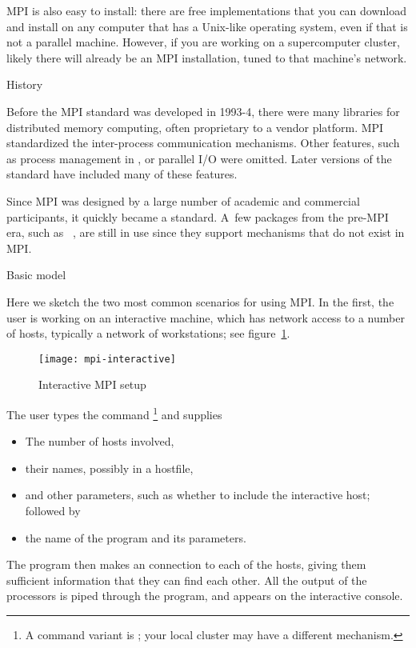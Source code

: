 MPI is also easy to install: there are free implementations
that you can download and install on any computer that has a Unix-like
operating system, even if that is not a parallel machine.
However, if you are working on a supercomputer cluster,
likely there will already be an MPI installation,
tuned to that machine's network.

 {History}

Before the MPI standard was developed in 1993-4, there were many
libraries for distributed memory computing, often proprietary
to a vendor platform. MPI standardized the inter-process communication
mechanisms. Other features, such as process management in ,
or parallel I/O were omitted. Later versions of the standard
have included many of these features.

Since MPI was designed by a large number of academic and commercial
participants, it quickly became a standard. A~few packages
from the pre-MPI era, such as ~\cite{charmpp},
are still in use since they support mechanisms that do not exist
in MPI.

 {Basic model}
\label{sec:mpiexec}

Here we sketch the two most common scenarios for using MPI. In the
first, the user is working on an interactive machine, which has
network access to a number of hosts, typically a network of workstations;
see figure~\ref{fig:mpi-interactive}.
\begin{figure}[ht]
  \texttt{[image: mpi-interactive]}
  \caption{Interactive MPI setup}
  \label{fig:mpi-interactive}
\end{figure}
The user types the command \footnote
{A command variant is ; your local cluster
  may have a different mechanism.}
and supplies
\begin{itemize}
\item The number of hosts involved,
\item their names, possibly in a hostfile,
\item and other parameters, such as whether to include the interactive
  host; followed by
\item the name of the program and its parameters.
\end{itemize}
The  program then makes an  connection
to each of the hosts, giving them sufficient information that they 
can find each other. All the output of the processors is piped through the 
 program, and appears on the interactive console.

